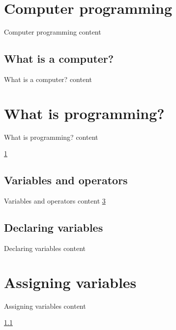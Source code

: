 \chapter{Computer programming}
\label{computer_programing}
Computer programming content

\section{What is a computer?}
\label{what_is_computer}
What is a computer? content

\chapter{What is programming?}
\label{what_is_programing}
What is programming? content

\ref{computer_programing}
\pageref{declaring_variables}

\section{Variables and operators}
\label{variables_and_operators}
Variables and operators content
\ref{assigning_variables}
\section{Declaring variables}
\label{declaring_variables}
Declaring variables content

\chapter{Assigning variables}
\label{assigning_variables}
Assigning variables content

\ref{what_is_computer}
\pageref{assigning_variables}
